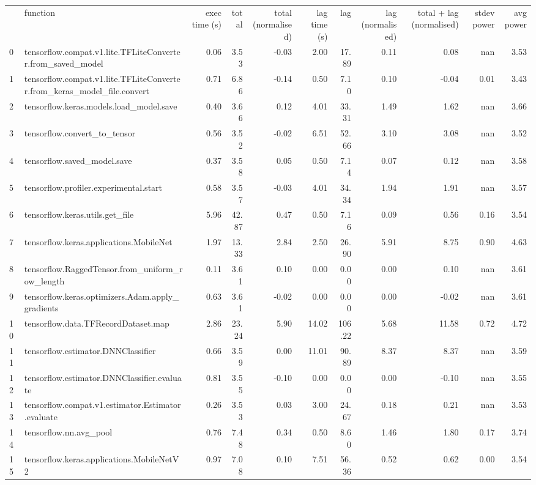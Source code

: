 \begin{tabular}{llrrrrrrrrr}
 & function & exec time (s) & total & total (normalised) & lag time (s) & lag & lag (normalised) & total + lag (normalised) & stdev power & avg power \\
0 & tensorflow.compat.v1.lite.TFLiteConverter.from_saved_model & 0.06 & 3.53 & -0.03 & 2.00 & 17.89 & 0.11 & 0.08 & nan & 3.53 \\
1 & tensorflow.compat.v1.lite.TFLiteConverter.from_keras_model_file.convert & 0.71 & 6.86 & -0.14 & 0.50 & 7.10 & 0.10 & -0.04 & 0.01 & 3.43 \\
2 & tensorflow.keras.models.load_model.save & 0.40 & 3.66 & 0.12 & 4.01 & 33.31 & 1.49 & 1.62 & nan & 3.66 \\
3 & tensorflow.convert_to_tensor & 0.56 & 3.52 & -0.02 & 6.51 & 52.66 & 3.10 & 3.08 & nan & 3.52 \\
4 & tensorflow.saved_model.save & 0.37 & 3.58 & 0.05 & 0.50 & 7.14 & 0.07 & 0.12 & nan & 3.58 \\
5 & tensorflow.profiler.experimental.start & 0.58 & 3.57 & -0.03 & 4.01 & 34.34 & 1.94 & 1.91 & nan & 3.57 \\
6 & tensorflow.keras.utils.get_file & 5.96 & 42.87 & 0.47 & 0.50 & 7.16 & 0.09 & 0.56 & 0.16 & 3.54 \\
7 & tensorflow.keras.applications.MobileNet & 1.97 & 13.33 & 2.84 & 2.50 & 26.90 & 5.91 & 8.75 & 0.90 & 4.63 \\
8 & tensorflow.RaggedTensor.from_uniform_row_length & 0.11 & 3.61 & 0.10 & 0.00 & 0.00 & 0.00 & 0.10 & nan & 3.61 \\
9 & tensorflow.keras.optimizers.Adam.apply_gradients & 0.63 & 3.61 & -0.02 & 0.00 & 0.00 & 0.00 & -0.02 & nan & 3.61 \\
10 & tensorflow.data.TFRecordDataset.map & 2.86 & 23.24 & 5.90 & 14.02 & 106.22 & 5.68 & 11.58 & 0.72 & 4.72 \\
11 & tensorflow.estimator.DNNClassifier & 0.66 & 3.59 & 0.00 & 11.01 & 90.89 & 8.37 & 8.37 & nan & 3.59 \\
12 & tensorflow.estimator.DNNClassifier.evaluate & 0.81 & 3.55 & -0.10 & 0.00 & 0.00 & 0.00 & -0.10 & nan & 3.55 \\
13 & tensorflow.compat.v1.estimator.Estimator.evaluate & 0.26 & 3.53 & 0.03 & 3.00 & 24.67 & 0.18 & 0.21 & nan & 3.53 \\
14 & tensorflow.nn.avg_pool & 0.76 & 7.48 & 0.34 & 0.50 & 8.60 & 1.46 & 1.80 & 0.17 & 3.74 \\
15 & tensorflow.keras.applications.MobileNetV2 & 0.97 & 7.08 & 0.10 & 7.51 & 56.36 & 0.52 & 0.62 & 0.00 & 3.54 \\

\end{tabular}
